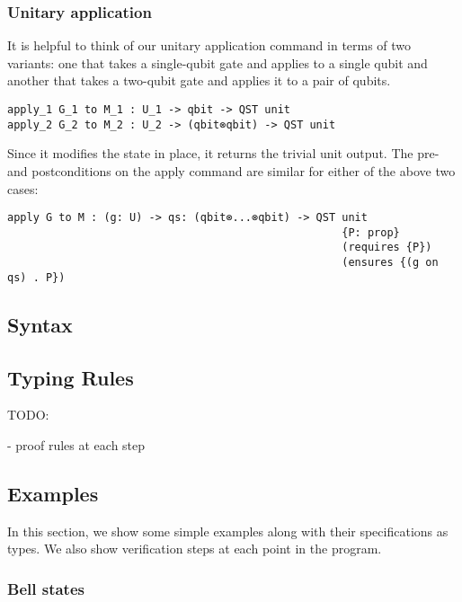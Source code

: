 \documentclass[adraft,creativecommons]{eptcs}
\theoremstyle{definition}
\theoremstyle{remark}
\begin{document}
\subsubsection{Unitary application}
It is helpful to think of our unitary application command in terms of two variants: one that takes a single-qubit gate and applies to a single qubit and another that takes a two-qubit gate and applies it to a pair of qubits.

\begin{lstlisting}[language=QHaskell]
apply_1 G_1 to M_1 : U_1 -> qbit -> QST unit
apply_2 G_2 to M_2 : U_2 -> (qbit⊗qbit) -> QST unit
\end{lstlisting}

Since it modifies the state in place, it returns the trivial unit output. The pre- and postconditions on the apply command are similar for either of the above two cases:

\begin{lstlisting}[language=QHaskell]
apply G to M : (g: U) -> qs: (qbit⊗...⊗qbit) -> QST unit
                                                    {P: prop}
                                                    (requires {P})
                                                    (ensures {(g on qs) . P})
\end{lstlisting}

\subsection{Syntax}





\subsection{Typing Rules}

TODO:

- proof rules at each step

\subsection{Examples}

In this section, we show some simple examples along with their specifications as types. We also show verification steps at each point in the program.

\subsubsection{Bell states}
\end{document}
